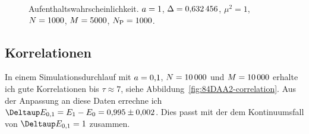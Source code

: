 \begin{figure}[htbp]
    \centering
    \caption{%
        Aufenthaltswahrscheinlichkeit. $a =
        \num{1}$, $\Delta = \num{0.632456}$, $\mu^2 = \num{1}$, $N =
        \num{1000}$, $M = \num{5000}$, $N_\text P = \num{1000}$.
    }
    \label{fig:histogram_10}
\end{figure}

\subsection{Korrelationen}

In einem Simulationsdurchlauf mit $a = \num{0.1}$, $N =
\num{10000}$ und $M = \num{10000}$ erhalte ich gute Korrelationen bis
$\tau \approx \num{7}$, siehe Abbildung~\ref{fig:84DAA2-correlation}. Aus der
Anpassung an diese Daten errechne ich $\Deltaup E_{0,1} = E_1 - E_0 =
\num{0.995 +- 0.002}$. Dies passt mit der dem Kontinuumsfall von $\Deltaup
E_{0,1} = \num{1}$ zusammen.

